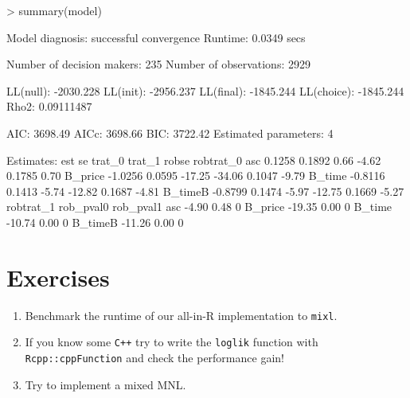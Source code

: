 \documentclass[a4paper]{article}
\begin{document}
\begin{Schunk}
\begin{Sinput}
> summary(model)
\end{Sinput}
\begin{Soutput}
Model diagnosis: successful convergence  
Runtime: 0.0349 secs

Number of decision makers: 235 
Number of observations: 2929 

LL(null):  -2030.228 
LL(init):  -2956.237 
LL(final):  -1845.244 
LL(choice):  -1845.244 
Rho2:  0.09111487 

AIC:  3698.49 
AICc:  3698.66 
BIC:  3722.42 
Estimated parameters:  4 

Estimates:
            est     se trat_0 trat_1  robse robtrat_0
asc      0.1258 0.1892   0.66  -4.62 0.1785      0.70
B_price -1.0256 0.0595 -17.25 -34.06 0.1047     -9.79
B_time  -0.8116 0.1413  -5.74 -12.82 0.1687     -4.81
B_timeB -0.8799 0.1474  -5.97 -12.75 0.1669     -5.27
        robtrat_1 rob_pval0 rob_pval1
asc         -4.90      0.48         0
B_price    -19.35      0.00         0
B_time     -10.74      0.00         0
B_timeB    -11.26      0.00         0
\end{Soutput}
\end{Schunk}


\section{Exercises}

\begin{enumerate}
  \item Benchmark the runtime of our all-in-R implementation to \texttt{mixl}.
  \item If you know some \texttt{C++} try to write the \texttt{loglik} function with \texttt{Rcpp::cppFunction} and check the performance gain!
  \item Try to implement a mixed MNL.
\end{enumerate}
\end{document}

